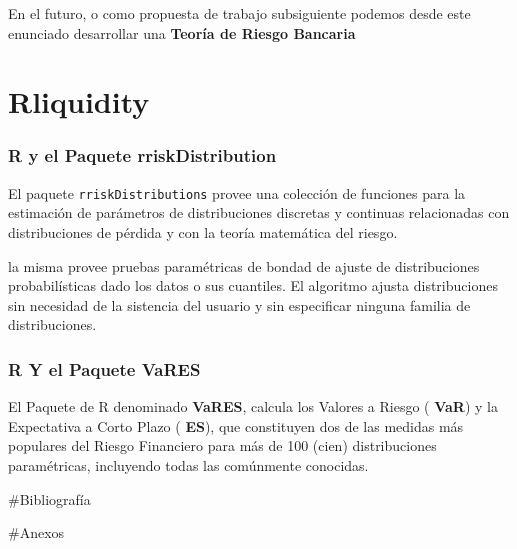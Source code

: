 \documentclass[10pt,]{article}
\begin{document}
En el futuro, o como propuesta de trabajo subsiguiente podemos desde
este enunciado desarrollar una \textbf{Teoría de Riesgo Bancaria}

\hypertarget{rliquidity}{%
\section{Rliquidity}\label{rliquidity}}

\hypertarget{r-y-el-paquete-rriskdistribution}{%
\subsubsection{\texorpdfstring{R y el Paquete
\textbf{rriskDistribution}}{R y el Paquete rriskDistribution}}\label{r-y-el-paquete-rriskdistribution}}

El paquete \texttt{rriskDistributions} provee una colección de funciones
para la estimación de parámetros de distribuciones discretas y continuas
relacionadas con distribuciones de pérdida y con la teoría matemática
del riesgo.

la misma provee pruebas paramétricas de bondad de ajuste de
distribuciones probabilísticas dado los datos o sus cuantiles. El
algoritmo ajusta distribuciones sin necesidad de la sistencia del
usuario y sin especificar ninguna familia de distribuciones.

\hypertarget{r-y-el-paquete-vares}{%
\subsubsection{\texorpdfstring{R Y el Paquete
\textbf{VaRES}}{R Y el Paquete VaRES}}\label{r-y-el-paquete-vares}}

El Paquete de R denominado \textbf{VaRES}, calcula los Valores a Riesgo
( \textbf{VaR}) y la Expectativa a Corto Plazo ( \textbf{ES}), que
constituyen dos de las medidas más populares del Riesgo Financiero para
más de 100 (cien) distribuciones paramétricas, incluyendo todas las
comúnmente conocidas.

\#Bibliografía

\#Anexos
\end{document}
